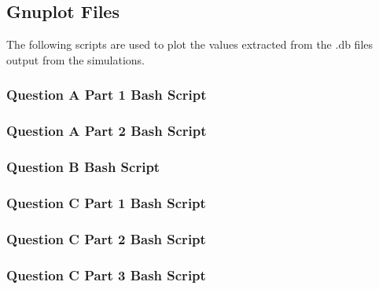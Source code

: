 \subsection{Gnuplot Files}
The following scripts are used to plot the values extracted from the .db files
output from the simulations.
\subsubsection{Question A Part 1 Bash Script}

\subsubsection{Question A Part 2 Bash Script}

\subsubsection{Question B Bash Script}

\subsubsection{Question C Part 1 Bash Script}

\subsubsection{Question C Part 2 Bash Script}

\subsubsection{Question C Part 3 Bash Script}


